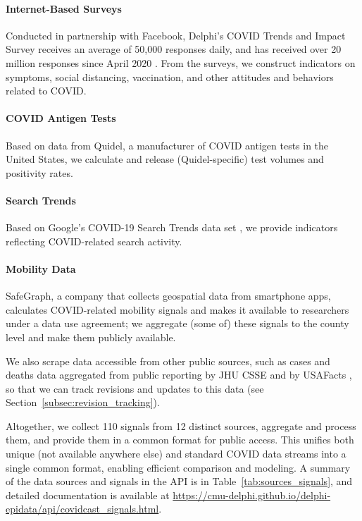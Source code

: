 \documentclass[9pt,twocolumn,twoside,lineno]{pnas-new}
\begin{document}
\paragraph{Internet-Based Surveys} Conducted in partnership with Facebook,
Delphi's COVID Trends and Impact Survey receives an average of 50,000 responses
daily, and has received over 20 million responses since April 2020
\cite{DelphiSurvey, Kreuter:2020}. From the surveys, we construct indicators on
symptoms, social distancing, vaccination, and other attitudes and behaviors
related to COVID.  

\paragraph{COVID Antigen Tests} Based on data from Quidel, a manufacturer of
COVID antigen tests in the United States, we calculate and release
(Quidel-specific) test volumes and positivity rates.  

\paragraph{Search Trends} Based on Google's COVID-19 Search Trends data set
\cite{GoogleSymptoms}, we provide indicators reflecting COVID-related search  
activity.

\paragraph{Mobility Data} SafeGraph, a company that collects geospatial data
from smartphone apps, calculates COVID-related mobility signals
\cite{SafeGraphSocial, SafeGraphPatterns} and makes it available to researchers 
under a data use agreement; we aggregate (some of) these signals to the county
level and make them publicly available.     

\medskip
We also scrape data accessible from other public sources, such as cases and
deaths data aggregated from public reporting by JHU CSSE \cite{Dong:2020} and by
USAFacts \cite{USAFacts}, so that we can track revisions and updates to this data
(see Section~\ref{subsec:revision_tracking}).

Altogether, we collect 110 signals from 12 distinct sources, aggregate and
process them, and provide them in a common format for public access. This
unifies both unique (not available anywhere else) and standard COVID data
streams into a single common format, enabling efficient comparison and modeling.
A summary of the data sources and signals in the API is in
Table~\ref{tab:sources_signals}, and detailed documentation is available at 
\url{https://cmu-delphi.github.io/delphi-epidata/api/covidcast_signals.html}.
\end{document}
